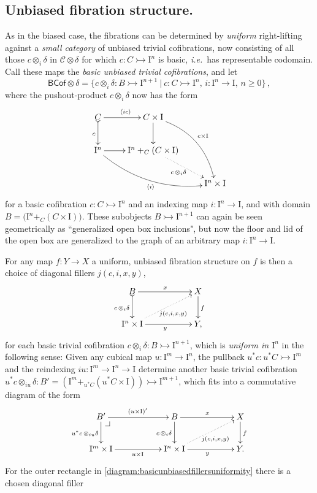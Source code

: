 \documentclass[11pt,reqno]{amsart}
\makeatletter
\newcommand{\ie}{\emph{i.e.}}
\newcommand{\mono}{\ensuremath{\rightarrowtail}}
\newcommand{\ra}{\ensuremath{\rightarrow}}
\newcommand{\gph}[1]{\ensuremath{\langle #1 \rangle}}
\newcommand{\I}{\ensuremath{\mathrm{I}}}
\theoremstyle{remark}
\theoremstyle{definition}
\newcommand{\pbcorner}[1][dr]{\save*!/#1-1.2pc/#1:(-1,1)@^{|-}\restore}
\makeatother
\begin{document}
\subsection*{Unbiased fibration structure.}\label{sec:unbiasedfibration}

As in the biased case, the fibrations can be determined by \emph{uniform} right-lifting against a  \emph{small category} of unbiased trivial cofibrations, now consisting of all those $c \otimes_i \delta$ in $\mathcal{C}\otimes \delta$ for which $c : C \mono \I^n$ is basic, \ie\ has representable codomain.  Call these maps the \emph{basic unbiased trivial cofibrations}, and let 
\begin{equation}\label{eq:basicunbiasedTCof}
\mathsf{BCof}\otimes \delta = \{c \otimes_i \delta : B \mono \I^{n+1}\ |\ c : C\mono \I^n,\, i : \I^n \ra \I,\,n\geq 0\}\,,
\end{equation}
where the pushout-product $c\otimes_i \delta$ now has the form
\begin{equation}\label{diagram:unbiasedbasicpushoutproduct}
\xymatrix{
C \ar@{>->}[d]_{c} \ar[r]^{\gph{ic}} & C\times \I \ar[d] \ar@/^4ex/ [rdd]^{c\times\I}\\
\I^n \ar@/_4ex/ [rrd]_{\gph{i}} \ar[r] &  \I^n +_C (C\times\I) \ar@{.>}[rd]_{c\, \otimes_i \delta} \\
&& \I^n\times\I
}
\end{equation}
for a basic cofibration $c : C\mono \I^n$ and an indexing map $i : \I^n \ra \I$, and with domain $B = \big(\I^n +_C (C\times\I)\big)$.   These subobjects $B \mono \I^{n+1}$ can again be seen geometrically as ``generalized open box inclusions", but now the floor and lid of the open box are generalized to the graph of an arbitrary map $i:\I^n\ra \I$.

For any map $f:Y\ra X$  a uniform, unbiased fibration structure on $f$ is then a choice of diagonal fillers $j(c,i,x,y)$,
\begin{equation}\label{diagram:basicunbiasedfillers}
\xymatrix{
B \ar@{>->}[d]_{c\,\otimes_i\delta} \ar[rr]^x && X \ar[d]^f \\
\I^{n}\times \I \ar@{.>}[rru]_{j(c,i,x,y)} \ar[rr]_y && Y,
}
\end{equation}
for each basic trivial cofibration $c \otimes_i \delta : B \mono \I^{n+1}$, which is \emph{uniform in $\I^n$} in the following sense: Given any cubical map $u : \I^m \ra \I^n$, the pullback $u^*c : u^*C\mono \I^m$ and the reindexing $iu : \I^m \ra \I^n\ra\I$ determine another basic trivial cofibration $u^*c \otimes_{iu} \delta : B' = (\I^m +_{u^*C} (u^*C\times\I)) \mono \I^{m+1}$, which fits into a commutative diagram of the form
\begin{equation}\label{diagram:basicunbiasedfillersuniformity}
\xymatrix{
B' \ar[d]_{u^*c\,\otimes_{iu}\delta} \ar[rr]^{(u\times \I)'} \pbcorner  && B \ar[d]_{c\,\otimes_i\delta} \ar[rr]^x && X \ar[d]^f \\
\I^{m}\times \I  \ar[rr]_{u\times \I} && \I^{n}\times \I \ar@{.>}[rru]_{j(c,i,x,y)} \ar[rr]_y && Y.
}
\end{equation}
For the outer rectangle in \eqref{diagram:basicunbiasedfillersuniformity} there is a chosen diagonal filler 
\end{document}
